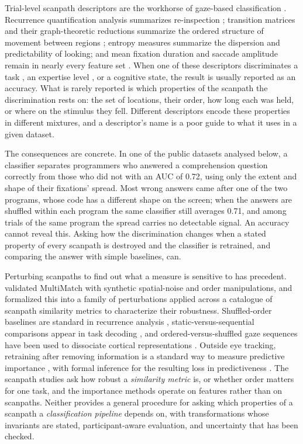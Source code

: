 Trial-level scanpath descriptors are the workhorse of gaze-based classification \citep{selim2024review}. Recurrence quantification analysis summarizes re-inspection \citep{anderson2013recurrence}; transition matrices and their graph-theoretic reductions summarize the ordered structure of movement between regions \citep{smith2010eye, popelka2016scangraph}; entropy measures summarize the dispersion and predictability of looking; and mean fixation duration and saccade amplitude remain in nearly every feature set \citep{holmqvist2011eye}. When one of these descriptors discriminates a task \citep{greene2012reconsidering, borji2014defending, coutrot2018scanpath, shubi2025decoding}, an expertise level \citep{gegenfurtner2011expertise}, or a cognitive state, the result is usually reported as an accuracy. What is rarely reported is which properties of the scanpath the discrimination rests on: the set of locations, their order, how long each was held, or where on the stimulus they fell. Different descriptors encode these properties in different mixtures, and a descriptor's name is a poor guide to what it uses in a given dataset.

The consequences are concrete. In one of the public datasets analysed below, a classifier separates programmers who answered a comprehension question correctly from those who did not with an AUC of 0.72, using only the extent and shape of their fixations' spread. Most wrong answers came after one of the two programs, whose code has a different shape on the screen; when the answers are shuffled within each program the same classifier still averages 0.71, and among trials of the same program the spread carries no detectable signal. An accuracy cannot reveal this. Asking how the discrimination changes when a stated property of every scanpath is destroyed and the classifier is retrained, and comparing the answer with simple baselines, can.

Perturbing scanpaths to find out what a measure is sensitive to has precedent. \citet{dewhurst2012multimatch} validated MultiMatch with synthetic spatial-noise and order manipulations, and \citet{fahimi2021metrics} formalized this into a family of perturbations applied across a catalogue of scanpath similarity metrics to characterize their robustness. Shuffled-order baselines are standard in recurrence analysis \citep{anderson2013recurrence, anderson2015comparison}, static-versus-sequential comparisons appear in task decoding \citep{greene2012reconsidering}, and ordered-versus-shuffled gaze sequences have been used to dissociate cortical representations \citep{meghanathan2026temporal}. Outside eye tracking, retraining after removing information is a standard way to measure predictive importance \citep{hooker2019benchmark}, with formal inference for the resulting loss in predictiveness \citep{williamson2023general}. The scanpath studies ask how robust a \emph{similarity metric} is, or whether order matters for one task, and the importance methods operate on features rather than on scanpaths. Neither provides a general procedure for asking which properties of a scanpath a \emph{classification pipeline} depends on, with transformations whose invariants are stated, participant-aware evaluation, and uncertainty that has been checked.

